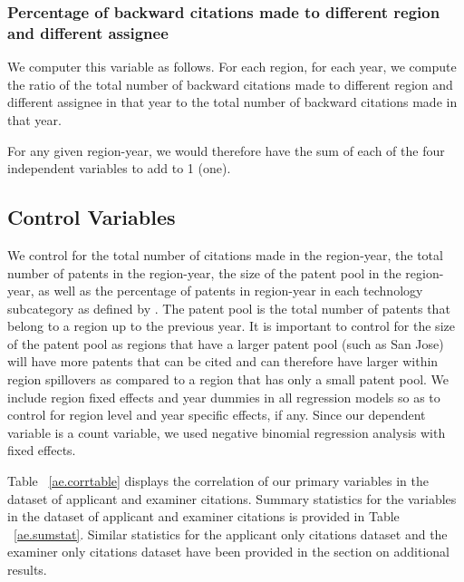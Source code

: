 \documentclass[12pt,letterpaper]{article}
\begin{document}
\subsubsection{Percentage of backward citations made to different region and different assignee}
We computer this variable as follows. For each region, for each year, we compute the ratio of the total number of backward citations made to different region and different assignee in that year to the total number of backward citations made in that year.\par

For any given region-year, we would therefore have the sum of each of the four independent variables to add to 1 (one).

\subsection{Control Variables}
We control for the total number of citations made in the region-year, the total number of patents in the region-year, the size of the patent pool in the region-year, as well as the percentage of patents in region-year in each technology subcategory as defined by \cite*{Hall2001a}. The patent pool is the total number of patents that belong to a region up to the previous year. It is important to control for the size of the patent pool as  regions that have a larger patent pool (such as San Jose) will have more patents that can be cited and can therefore have larger within region spillovers as compared to a region that has only a small patent pool. We include region fixed effects and year dummies in all regression models so as to control for region level and year specific effects, if any. Since our dependent variable is a count variable, we used negative binomial regression analysis with fixed effects. \par

Table ~\ref{ae.corrtable} displays the correlation of our primary variables in the dataset of applicant and examiner citations. Summary statistics for the variables in the dataset of applicant and examiner citations is provided in Table ~\ref{ae.sumstat}. Similar statistics for the applicant only citations dataset and the examiner only citations dataset have been provided in the section on additional results.
\end{document}
